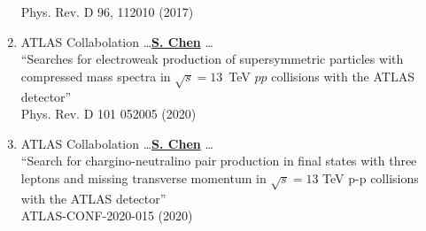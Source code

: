 \documentclass[12pt]{article}
\begin{document}
\begin{enumerate}
		    Phys. Rev. D 96, 112010 (2017) 	\label{Pub::ATLPaper_Incl1L_2017}
%
	\item ATLAS Collabolation \dots \underline{\textbf{S. Chen}} \dots \\
		   ``Searches for electroweak production of supersymmetric particles with compressed mass spectra in $\sqrt{s}=13$~TeV $pp$ collisions with the ATLAS detector'' \\
	            Phys. Rev. D 101 052005 (2020)      \label{Pub::ATLCONF_EWCompressed_LHCP2019}
%
	\item ATLAS Collabolation \dots \underline{\textbf{S. Chen}} \dots \\
          ``Search for chargino-neutralino pair production in final states with three leptons and missing transverse momentum in $\sqrt{s}=13$ TeV p-p collisions with the ATLAS detector'' \\
           ATLAS-CONF-2020-015 (2020)  	\label{Pub::ATLCONF_EW3L_LHCP2020}          
\end{enumerate}
\end{document}
